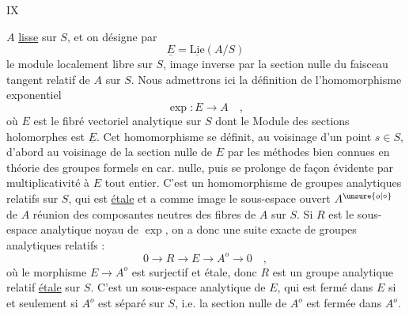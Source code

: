 \hfill IX

$A$ \uline{lisse} sur $S$, et on désigne par
\[
 \underline E=\underline{\mathrm{Lie}}(A/S)\tag*{(13.1.1)}
\]
le module localement libre sur $S$, image inverse par la section nulle du faisceau tangent relatif de $A$ sur $S$. Nous admettrons ici la définition de l'homomorphisme exponentiel
\[
 \exp:E\longrightarrow A\quad,\tag*{(13.1.2)}
\]
où $E$ est le fibré vectoriel analytique sur $S$ dont le Module des sections holomorphes est $\underline E$. Cet homomorphisme se définit, au voisinage d'un point $s\in S$, d'abord au voisinage de la section nulle de $E$ par les méthodes bien connues en théorie des groupes formels en car. nulle, puis se prolonge de façon évidente par multiplicativité à $E$ tout entier. C'est un homomorphisme de groupes analytiques relatifs sur $S$, qui est \uline{étale} et a comme image le sous-espace ouvert $A^{\unsure{o|\circ}}$ de $A$ réunion des composantes neutres des fibres de $A$ sur $S$. Si $R$ est le sous-espace analytique noyau de $\exp$, on a donc une suite exacte de groupes analytiques relatifs :
\[
 0\longrightarrow R\longrightarrow E\longrightarrow A^o\longrightarrow0\quad,\tag*{(13.1.3)}
\]
où le morphisme $E\longrightarrow A^o$ est surjectif et étale, donc $R$ est un groupe analytique relatif \uline{étale} sur $S$. C'est un sous-espace analytique de $E$, qui est fermé dans $E$ si et seulement si $A^o$ est séparé sur $S$, i.e. la section nulle de $A^o$ est fermée dans $A^o$.
